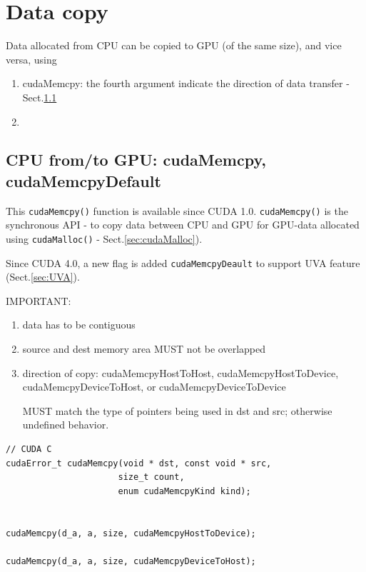 \section{Data copy}
\label{sec:cudac_datacopy}

Data allocated from CPU can be copied to GPU (of the same size), and vice versa, using
\begin{enumerate}
  \item cudaMemcpy:  the fourth argument indicate the direction of data transfer - Sect.\ref{sec:cudaMemcpy}
  

  
  \item 
\end{enumerate}

\subsection{CPU from/to GPU: cudaMemcpy, cudaMemcpyDefault}
\label{sec:cudaMemcpy}
\label{sec:cudaMemcpyDefault}

This \verb!cudaMemcpy()! function is available since CUDA 1.0.
\verb!cudaMemcpy()! is the synchronous API - to copy data between CPU and GPU
for GPU-data allocated using \verb!cudaMalloc()! - Sect.\ref{sec:cudaMalloc}).

Since CUDA 4.0, a new flag is added \verb!cudaMemcpyDeault! to support UVA
feature (Sect.\ref{sec:UVA}).

IMPORTANT:
\begin{enumerate}
  \item data has to be contiguous
  
  \item source and dest memory area MUST not be overlapped
  
  \item direction of copy:  cudaMemcpyHostToHost, cudaMemcpyHostToDevice, cudaMemcpyDeviceToHost, or cudaMemcpyDeviceToDevice
  
  MUST match the type of pointers being used in dst and src; otherwise undefined behavior.
  
  
\end{enumerate}
\begin{verbatim}
// CUDA C
cudaError_t cudaMemcpy(void * dst, const void * src, 
                      size_t count, 
                      enum cudaMemcpyKind kind);


cudaMemcpy(d_a, a, size, cudaMemcpyHostToDevice);

cudaMemcpy(d_a, a, size, cudaMemcpyDeviceToHost);
\end{verbatim}

